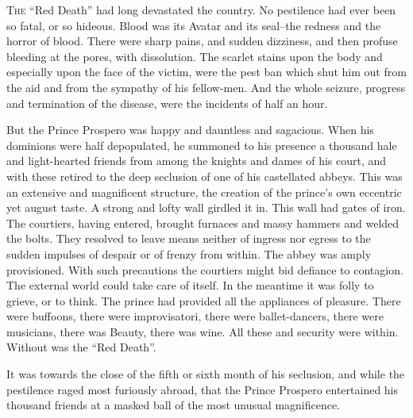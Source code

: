 \documentclass[smalldemyvopaper,14pt,twoside,onecolumn,openright,extrafontsizes,showtrims]{memoir}
\begin{document}
\lettrine{T}{he} ``Red Death'' had long devastated the country. No pestilence had ever been so fatal, or so hideous. Blood was its Avatar and its seal--the redness and the horror of blood. There were sharp pains, and sudden dizziness, and then profuse bleeding at the pores, with dissolution. The scarlet stains upon the body and especially upon the face of the victim, were the pest ban which shut him out from the aid and from the sympathy of his fellow-men. And the whole seizure, progress and termination of the disease, were the incidents of half an hour.

But the Prince Prospero was happy and dauntless and sagacious. When his dominions were half depopulated, he summoned to his presence a thousand hale and light-hearted friends from among the knights and dames of his court, and with these retired to the deep seclusion of one of his castellated abbeys. This was an extensive and magnificent structure, the creation of the prince's own eccentric yet august taste. A strong and lofty wall girdled it in. This wall had gates of iron. The courtiers, having entered, brought furnaces and massy hammers and welded the bolts. They resolved to leave means neither of ingress nor egress to the sudden impulses of despair or of frenzy from within. The abbey was amply provisioned. With such precautions the courtiers might bid defiance to contagion. The external world could take care of itself. In the meantime it was folly to grieve, or to think. The prince had provided all the appliances of pleasure. There were buffoons, there were improvisatori, there were ballet-dancers, there were musicians, there was Beauty, there was wine. All these and security were within. Without was the ``Red Death''.

It was towards the close of the fifth or sixth month of his seclusion, and while the pestilence raged most furiously abroad, that the Prince Prospero entertained his thousand friends at a masked ball of the most unusual magnificence.
\end{document}
